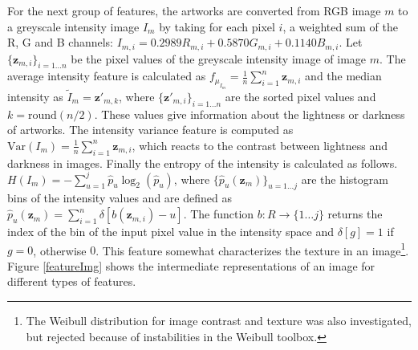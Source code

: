 For the next group of features, the artworks are converted from RGB image $m$ to a greyscale intensity image $I_m$ by taking for each pixel $i$, a weighted sum of the R, G and B channels: $I_{m,i} = 0.2989R_{m,i} + 0.5870G_{m,i} + 0.1140B_{m,i} $. Let $\{\mathbf{z}_{m,i}\}_{i=1\dots n}$ be the pixel values of the greyscale intensity image of image $m$. The average intensity feature is calculated as $f_{\mu_{I_m}} = \frac{1}{n} \sum_{i = 1}^{n} \mathbf{z}_{m,i}$ and the median intensity as $\tilde{I}_m = \mathbf{z'}_{m,k}$, where $\{\mathbf{z'}_{m,i}\}_{i = 1\dots n}$ are the sorted pixel values and $k = \mbox{round}(n/2)$. These values give information about the lightness or darkness of artworks. The intensity variance feature is computed as $\mbox{Var}(I_m) = \frac{1}{n} \sum_{i=1}^n \mathbf{z}_{m,i}$, which reacts to the contrast between lightness and darkness in images. Finally the entropy of the intensity is calculated as follows. $H(I_m) = -\sum_{u = 1}^{j} \hat{p}_u \log_2(\hat{p}_u) $, where $\{\hat{p}_u(\mathbf{z}_m)\}_{u = 1 \dots j}$ are the histogram bins of the intensity values and are defined as $\hat{p}_u(\mathbf{z}_m) = \sum_{i=1}^n \delta[b(\mathbf{z}_{m,i}) - u] $. The function $b : R \rightarrow \{1 \dots j \}$ returns the index of the bin of the input pixel value in the intensity space and $\delta[g] = 1$ if $g = 0$, otherwise $0$. This feature somewhat characterizes the texture in an image\footnote{The Weibull distribution for image contrast and texture was also investigated, but rejected because of instabilities in the Weibull toolbox.}. Figure \ref{featureImg} shows the intermediate representations of an image for different types of features. 

